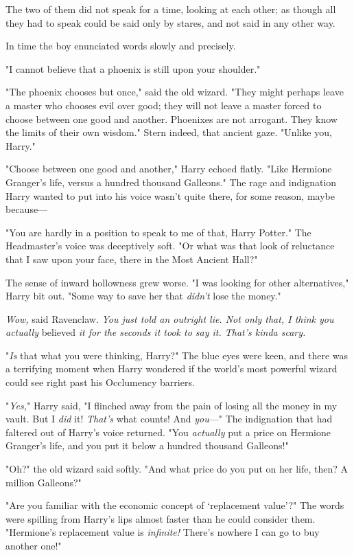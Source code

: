 The two of them did not speak for a time, looking at each other; as though all
they had to speak could be said only by stares, and not said in any other way.

In time the boy enunciated words slowly and precisely.

"I cannot believe that a phoenix is still upon your shoulder."

"The phoenix chooses but once," said the old wizard. "They might perhaps leave
a master who chooses evil over good; they will not leave a master forced to
choose between one good and another. Phoenixes are not arrogant. They know the
limits of their own wisdom." Stern indeed, that ancient gaze. "Unlike you,
Harry."

"Choose between one good and another," Harry echoed flatly. "Like Hermione
Granger's life, versus a hundred thousand Galleons." The rage and indignation
Harry wanted to put into his voice wasn't quite there, for some reason, maybe
because—

"You are hardly in a position to speak to me of that, Harry Potter." The
Headmaster's voice was deceptively soft. "Or what was that look of reluctance
that I saw upon your face, there in the Most Ancient Hall?"

The sense of inward hollowness grew worse. "I was looking for other
alternatives," Harry bit out. "Some way to save her that \emph{didn't} lose the
money."

\emph{Wow,} said Ravenclaw. \emph{You just told an outright lie. Not only that,
I think you actually} believed \emph{it for the seconds it took to say it.
That's kinda scary.}

"\emph{Is} that what you were thinking, Harry?" The blue eyes were keen, and
there was a terrifying moment when Harry wondered if the world's most powerful
wizard could see right past his Occlumency barriers.

"\emph{Yes,}" Harry said, "I flinched away from the pain of losing all the
money in my vault. But I \emph{did} it! \emph{That's} what counts! And
\emph{you}—" The indignation that had faltered out of Harry's voice returned.
"You \emph{actually} put a price on Hermione Granger's life, and you put it
below a hundred thousand Galleons!"

"Oh?" the old wizard said softly. "And what price do you put on her life, then?
A million Galleons?"

"Are you familiar with the economic concept of `replacement value'?" The words
were spilling from Harry's lips almost faster than he could consider them.
"Hermione's replacement value is \emph{infinite!} There's nowhere I can go to
buy another one!"

